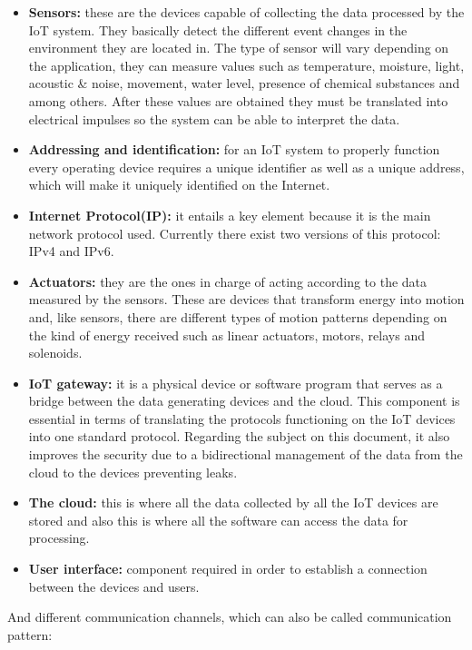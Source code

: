 \documentclass[11pt]{book}
\begin{document}
\begin{itemize}
\item \textbf{Sensors:} these are the devices capable of collecting the data processed by the IoT system. They basically detect the different event changes in the environment they are located in. The type of sensor will vary depending on the application, they can measure values such as temperature, moisture, light, acoustic \& noise, movement, water level, presence of chemical substances and among others. After these values are obtained they must be translated into electrical impulses so the system can be able to interpret the data.
\item \textbf{Addressing and identification:} for an IoT system to properly function every operating device requires a unique identifier as well as a unique address, which will make it uniquely identified on the Internet. 
\item\textbf{ Internet Protocol(IP):} it entails a key element because it is the main network protocol used. Currently there exist two versions of this protocol: IPv4 and IPv6. 
\item \textbf{Actuators:} they are the ones in charge of acting according to the data measured by the sensors. These are devices that transform energy into motion and, like sensors, there are different types of motion patterns depending on the kind of energy received such as linear actuators, motors, relays and solenoids.
\item \textbf{IoT gateway:} it is a physical device or software program that serves as a bridge between the data generating devices and the cloud. This component is essential in terms of translating the protocols functioning on the IoT devices into one standard protocol. Regarding the subject on this document, it also improves the security due to a bidirectional management of the data from the cloud to the devices preventing leaks. 
\item \textbf{The cloud:} this is where all the data collected by all the IoT devices are stored and also this is where all the software can access the data for processing.
\item \textbf{User interface:} component required in order to establish a connection between the devices and users. 
\end{itemize}
And different communication channels, which can also be called communication pattern:
\end{document}
